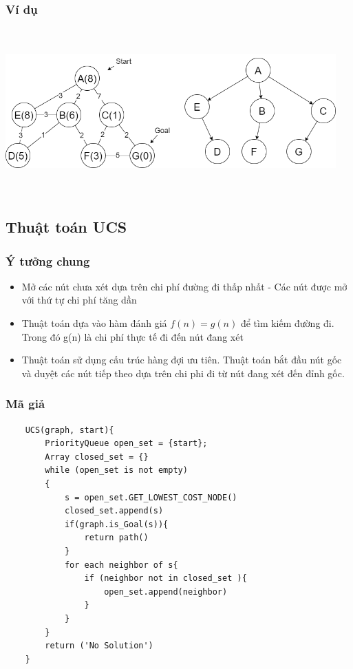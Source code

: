\documentclass{article}
\begin{document}
\subsubsection{Ví dụ}
    \centerline{\includegraphics[width=5in, height=2.5in]{image/bfs.png}}
    \vspace{2\baselineskip}
\subsection{Thuật toán UCS}
\subsubsection{Ý tưởng chung}
\begin{itemize}
    \item Mở các nút chưa xét dựa trên chi phí đường đi thấp nhất - Các nút được mở với thứ tự chi phí tăng dần
    \item Thuật toán dựa vào hàm đánh giá $f(n) = g(n)$ để tìm kiếm đường đi. Trong đó g(n) là chi phí thực tế đi đến nút đang xét
    \item Thuật toán sử dụng cấu trúc hàng đợi ưu tiên. Thuật toán bắt đầu nút gốc và duyệt các nút tiếp theo dựa trên chi phi đi từ nút đang xét đến đỉnh gốc.
\end{itemize}

\subsubsection{Mã giả}
\begin{verbatim}
    UCS(graph, start){
        PriorityQueue open_set = {start};
        Array closed_set = {}
        while (open_set is not empty)
        {
            s = open_set.GET_LOWEST_COST_NODE()
            closed_set.append(s)  
            if(graph.is_Goal(s)){
                return path()
            }
            for each neighbor of s{
                if (neighbor not in closed_set ){ 
                    open_set.append(neighbor)
                }   
            }
        } 
        return ('No Solution')
    }
    
\end{verbatim}
\end{document}
